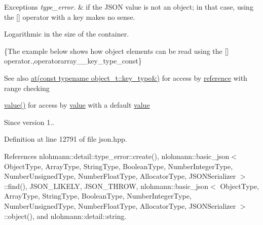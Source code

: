 \begin{DoxyExceptions}{Exceptions}
{\em type\+\_\+error.} & if the J\+S\+ON value is not an object; in that case, using the \mbox{[}\mbox{]} operator with a key makes no sense.\\
\hline
\end{DoxyExceptions}
Logarithmic in the size of the container.

\{The example below shows how object elements can be read using the {\ttfamily \mbox{[}\mbox{]}} operator.,operatorarray\+\_\+\+\_\+key\+\_\+type\+\_\+const\}

\begin{DoxySeeAlso}{See also}
\hyperlink{classnlohmann_1_1basic__json_a93403e803947b86f4da2d1fb3345cf2c}{at(const typename object\+\_\+t\+::key\+\_\+type\&)} for access by \hyperlink{classnlohmann_1_1basic__json_ac6a5eddd156c776ac75ff54cfe54a5bc}{reference} with range checking 

\hyperlink{classnlohmann_1_1basic__json_adcf8ca5079f5db993820bf50036bf45d}{value()} for access by \hyperlink{classnlohmann_1_1basic__json_adcf8ca5079f5db993820bf50036bf45d}{value} with a default \hyperlink{classnlohmann_1_1basic__json_adcf8ca5079f5db993820bf50036bf45d}{value}
\end{DoxySeeAlso}
\begin{DoxySince}{Since}
version 1.. 
\end{DoxySince}


Definition at line 12791 of file json.\+hpp.



References nlohmann\+::detail\+::type\+\_\+error\+::create(), nlohmann\+::basic\+\_\+json$<$ Object\+Type, Array\+Type, String\+Type, Boolean\+Type, Number\+Integer\+Type, Number\+Unsigned\+Type, Number\+Float\+Type, Allocator\+Type, J\+S\+O\+N\+Serializer $>$\+::find(), J\+S\+O\+N\+\_\+\+L\+I\+K\+E\+LY, J\+S\+O\+N\+\_\+\+T\+H\+R\+OW, nlohmann\+::basic\+\_\+json$<$ Object\+Type, Array\+Type, String\+Type, Boolean\+Type, Number\+Integer\+Type, Number\+Unsigned\+Type, Number\+Float\+Type, Allocator\+Type, J\+S\+O\+N\+Serializer $>$\+::object(), and nlohmann\+::detail\+::string.


